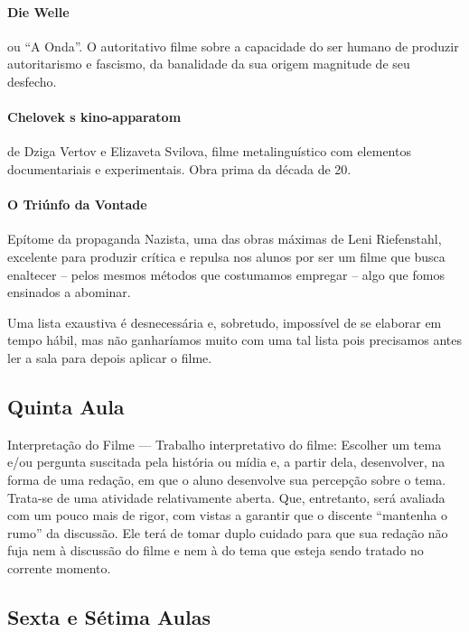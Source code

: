 \documentclass[12pt,a4paper]{article}
\begin{document}
	\paragraph{Die Welle} ou ``A Onda''. O autoritativo 
		filme sobre a capacidade do ser humano de 
		produzir autoritarismo e fascismo, da banalidade
		da sua origem magnitude de seu desfecho.

	\paragraph{Chelovek s kino-apparatom} de Dziga Vertov e
		Elizaveta Svilova, filme metalinguístico com 
		elementos documentariais e experimentais. Obra 
		prima da década de 20.

	\paragraph{O Triúnfo da Vontade} Epítome da propaganda 
		Nazista, uma das obras máximas de Leni 
		Riefenstahl, excelente para produzir crítica e 
		repulsa nos alunos por ser um filme que busca 
		enaltecer -- pelos mesmos métodos que costumamos 
		empregar -- algo que fomos ensinados a abominar.
		
	Uma lista exaustiva é desnecessária e, sobretudo, 
	impossível de se elaborar em tempo hábil, mas não 
	ganharíamos muito com uma tal lista pois precisamos
	antes ler a sala para depois aplicar o filme.

	\subsection*{Quinta Aula}
	
	Interpretação do Filme --- Trabalho interpretativo do filme:
	Escolher um tema e/ou pergunta suscitada pela história ou 
	mídia e, a partir dela, desenvolver, na forma de uma redação, 
	em que o aluno desenvolve sua percepção sobre o tema. Trata-se 
	de uma atividade relativamente aberta. Que, entretanto, será 
	avaliada com um pouco mais de rigor, com vistas a garantir 
	que o discente ``mantenha o rumo'' da discussão. Ele terá de 
	tomar duplo cuidado para que sua redação não fuja nem à 
	discussão do filme e nem à do tema que esteja sendo tratado 
	no corrente momento. 

	\subsection*{Sexta e Sétima Aulas}
	
\end{document}
